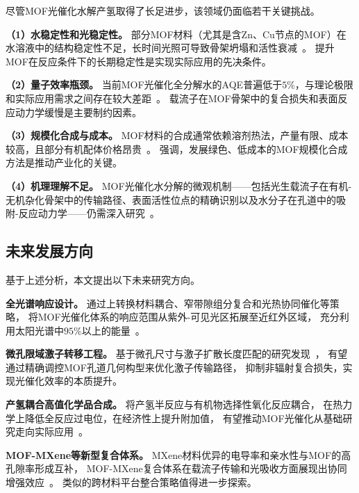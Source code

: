 尽管MOF光催化水解产氢取得了长足进步，该领域仍面临若干关键挑战。

\textbf{（1）水稳定性和光稳定性。}
部分MOF材料（尤其是含Zn、Cu节点的MOF）在水溶液中的结构稳定性不足，长时间光照可导致骨架坍塌和活性衰减~\citep{hassan2024emerging_trends}。 %
提升MOF在反应条件下的长期稳定性是实现实际应用的先决条件。

\textbf{（2）量子效率瓶颈。}
当前MOF光催化全分解水的AQE普遍低于$5\%$，与理论极限和实际应用需求之间存在较大差距~\citep{chen2023mof_owsp_review}。 %
载流子在MOF骨架中的复合损失和表面反应动力学缓慢是主要制约因素。

\textbf{（3）规模化合成与成本。}
MOF材料的合成通常依赖溶剂热法，产量有限、成本较高，且部分有机配体价格昂贵~\citep{wang2025mof_pec_review}。 %
\citet{jiang2026mof_review}强调，发展绿色、低成本的MOF规模化合成方法是推动产业化的关键。 %

\textbf{（4）机理理解不足。}
MOF光催化水分解的微观机制——包括光生载流子在有机-无机杂化骨架中的传输路径、表面活性位点的精确识别以及水分子在孔道中的吸附-反应动力学——仍需深入研究~\citep{pmc2024mof_energy_env}。


\subsection{未来发展方向}

基于上述分析，本文提出以下未来研究方向。

\textbf{全光谱响应设计。}
通过上转换材料耦合、窄带隙组分复合和光热协同催化等策略，
将MOF光催化体系的响应范围从紫外-可见光区拓展至近红外区域，
充分利用太阳光谱中$95\%$以上的能量~\citep{mof_fullspectrum_2025}。 %

\textbf{微孔限域激子转移工程。}
基于微孔尺寸与激子扩散长度匹配的研究发现~\citep{zhou2023micropore_exciton}，
有望通过精确调控MOF孔道几何构型来优化激子传输路径，
抑制非辐射复合损失，实现光催化效率的本质提升。 %

\textbf{产氢耦合高值化学品合成。}
将产氢半反应与有机物选择性氧化反应耦合，
在热力学上降低全反应过电位，在经济性上提升附加值，
有望推动MOF光催化从基础研究走向实际应用~\citep{lin2025coupled_oxidation}。 %

\textbf{MOF-MXene等新型复合体系。}
MXene材料优异的电导率和亲水性与MOF的高孔隙率形成互补，
MOF-MXene复合体系在载流子传输和光吸收方面展现出协同增强效应~\citep{mxene_mof_2024}。 %
类似的跨材料平台整合策略值得进一步探索。

